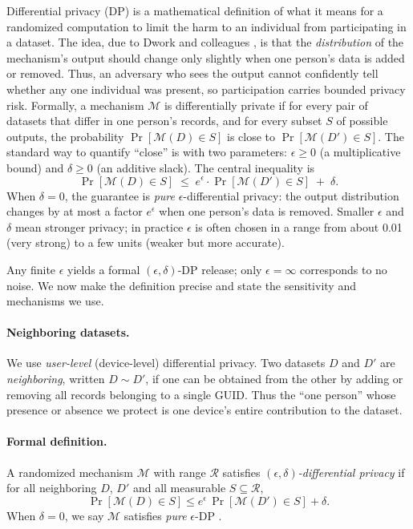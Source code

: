 \documentclass[12pt,letterpaper]{article}
\begin{document}
Differential privacy (DP) is a mathematical definition of what it means for a randomized computation to limit the harm to an individual from participating in a dataset. The idea, due to Dwork and colleagues \cite{dwork2006calibrating,dwork2014promise}, is that the \emph{distribution} of the mechanism's output should change only slightly when one person's data is added or removed. Thus, an adversary who sees the output cannot confidently tell whether any one individual was present, so participation carries bounded privacy risk. Formally, a mechanism $\mathcal{M}$ is differentially private if for every pair of datasets that differ in one person's records, and for every subset $S$ of possible outputs, the probability $\Pr[\mathcal{M}(D) \in S]$ is close to $\Pr[\mathcal{M}(D') \in S]$. The standard way to quantify ``close'' is with two parameters: $\epsilon \geq 0$ (a multiplicative bound) and $\delta \geq 0$ (an additive slack). The central inequality is
\begin{equation}
\label{eq:dpdef_highlevel}
\Pr[\mathcal{M}(D) \in S] \;\leq\; e^{\epsilon} \cdot \Pr[\mathcal{M}(D') \in S] \;+\; \delta.
\end{equation}
When $\delta = 0$, the guarantee is \emph{pure} $\epsilon$-differential privacy: the output distribution changes by at most a factor $e^\epsilon$ when one person's data is removed. Smaller $\epsilon$ and $\delta$ mean stronger privacy; in practice $\epsilon$ is often chosen in a range from about 0.01 (very strong) to a few units (weaker but more accurate).

Any finite $\epsilon$ yields a formal $(\epsilon,\delta)$-DP release; only $\epsilon = \infty$ corresponds to no noise. We now make the definition precise and state the sensitivity and mechanisms we use.

\paragraph{Neighboring datasets.}
We use \emph{user-level} (device-level) differential privacy. Two datasets $D$ and $D'$ are \emph{neighboring}, written $D \sim D'$, if one can be obtained from the other by adding or removing all records belonging to a single GUID. Thus the ``one person'' whose presence or absence we protect is one device's entire contribution to the dataset.

\paragraph{Formal definition.}
A randomized mechanism $\mathcal{M}$ with range $\mathcal{R}$ satisfies \emph{$(\epsilon,\delta)$-differential privacy} if for all neighboring $D$, $D'$ and all measurable $S \subseteq \mathcal{R}$,
\begin{equation}
\label{eq:dpdef}
\Pr[\mathcal{M}(D) \in S] \leq e^{\epsilon} \, \Pr[\mathcal{M}(D') \in S] + \delta.
\end{equation}
When $\delta = 0$, we say $\mathcal{M}$ satisfies \emph{pure} $\epsilon$-DP \cite{dwork2014promise}.
\end{document}

